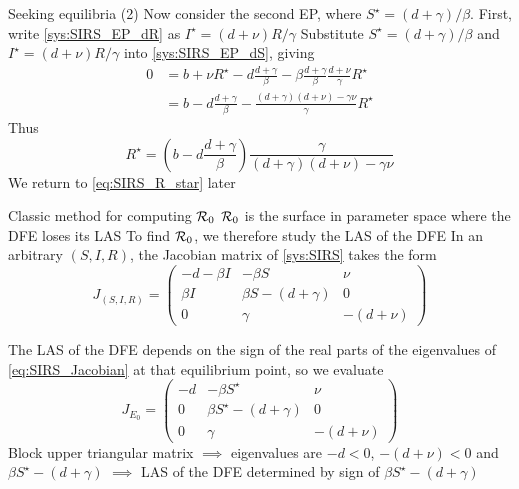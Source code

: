 \documentclass[aspectratio=43]{beamer}
\begin{document}
\begin{frame}{Seeking equilibria (2)}
Now consider the second EP, where $S^\star=(d+\gamma)/\beta$. First, write \eqref{sys:SIRS_EP_dR} as $I^\star=(d+\nu)R/\gamma$
\vfill
Substitute $S^\star=(d+\gamma)/\beta$ and $I^\star=(d+\nu)R/\gamma$ into \eqref{sys:SIRS_EP_dS}, giving
\begin{align*}
0 &= b+\nu R^\star-d\frac{d+\gamma}{\beta}
-\beta\frac{d+\gamma}{\beta}\frac{d+\nu}{\gamma}R^\star \\
&= b-d\frac{d+\gamma}{\beta}
-\frac{(d+\gamma)(d+\nu)-\gamma\nu}{\gamma}R^\star
\end{align*}
Thus
\begin{equation}\label{eq:SIRS_R_star}
R^\star =
\left(b-d\frac{d+\gamma}{\beta}\right)
\frac{\gamma}{(d+\gamma)(d+\nu)-\gamma\nu}
\end{equation}
\vfill
We return to \eqref{eq:SIRS_R_star} later
\end{frame}



\begin{frame}{Classic method for computing $\mathcal{R}_0$}
$\mathcal{R}_0$ is the surface in parameter space where the DFE loses its LAS
\vfill
To find $\mathcal{R}_0$, we therefore study the LAS of the DFE
\vfill
In an arbitrary $(S,I,R)$, the Jacobian matrix of \eqref{sys:SIRS} takes the form
\begin{equation}
\label{eq:SIRS_Jacobian}
J_{(S,I,R)} =
\begin{pmatrix}
-d-\beta I & -\beta S & \nu \\
\beta I & \beta S-(d+\gamma) & 0 \\
0 & \gamma & -(d+\nu)
\end{pmatrix}
\end{equation}
\end{frame}

\begin{frame}
The LAS of the DFE depends on the sign of the real parts of the eigenvalues of \eqref{eq:SIRS_Jacobian} at that equilibrium point, so we evaluate
\begin{equation}
\label{eq:SIRS_Jacobian_DFE}
J_{E_0} =
\begin{pmatrix}
-d & -\beta S^\star & \nu \\
0 & \beta S^\star-(d+\gamma) & 0 \\
0 & \gamma & -(d+\nu)
\end{pmatrix}
\end{equation}
\vfill
Block upper triangular matrix $\implies$ eigenvalues are $-d<0$, $-(d+\nu)<0$ and $\beta S^\star-(d+\gamma)$ 
\vfill
$\implies$ LAS of the DFE determined by sign of $\beta S^\star-(d+\gamma)$
\end{frame}
\end{document}
